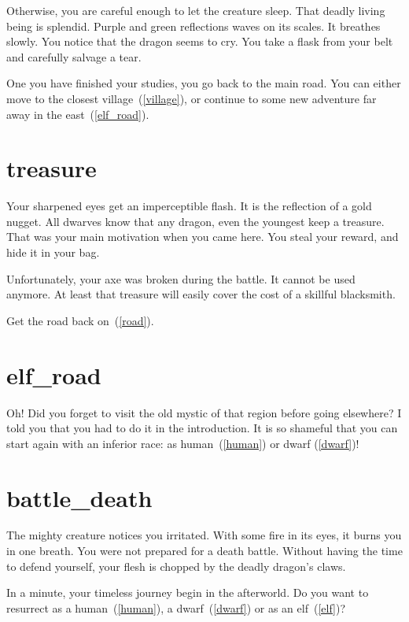 Otherwise, you are careful enough to let the creature sleep. That deadly living
being is splendid. Purple and green reflections waves on its scales. It breathes
slowly. You notice that the dragon seems to cry. You take a flask from your belt
and carefully salvage a tear.

One you have finished your studies, you go back to the main road. You can either
move to the closest village~(\ref{village}), or continue to some new adventure
far away in the east~(\ref{elf_road}).

\section{treasure}

Your sharpened eyes get an imperceptible flash. It is the reflection of a gold
nugget. All dwarves know that any dragon, even the youngest keep a treasure. That
was your main motivation when you came here. You steal your reward, and hide it
in your bag.

Unfortunately, your axe was broken during the battle. It cannot be used anymore.
At least that treasure will easily cover the cost of a skillful blacksmith.

Get the road back on~(\ref{road}).


\section{elf_road}

Oh! Did you forget to visit the old mystic of that region before going
elsewhere? I told you that you had to do it in the introduction. It is so
shameful that you can start again with an inferior race: as human~(\ref{human})
or dwarf (\ref{dwarf})!

\section{battle_death}

The mighty creature notices you irritated. With some fire in its eyes, it burns
you in one breath. You were not prepared for a death battle. Without having the
time to defend yourself, your flesh is chopped by the deadly dragon's claws.

\medbreak

In a minute, your timeless journey begin in the afterworld. Do you want to resurrect
as a human~(\ref{human}), a dwarf~(\ref{dwarf}) or as an elf~(\ref{elf})?

